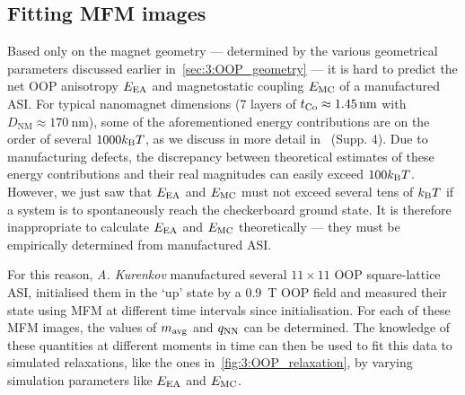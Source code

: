 \subsection{Fitting MFM images}\label{sec:3:MFM}
Based only on the magnet geometry --- determined by the various geometrical parameters discussed earlier in~\cref{sec:3:OOP_geometry} --- it is hard to predict the net OOP anisotropy $E_\mathrm{EA}$ and magnetostatic coupling $E_\mathrm{MC}$ of a manufactured ASI.
For typical nanomagnet dimensions (7 layers of $t_{\ce{Co}} \approx \SI{1.45}{\nano\metre}$ with $D_\mathrm{NM} \approx \SI{170}{\nano\metre}$), some of the aforementioned energy contributions are on the order of several $1000 \kBT$, as we discuss in more detail in~ (Supp. 4). %
Due to manufacturing defects, the discrepancy between theoretical estimates of these energy contributions and their real magnitudes can easily exceed $100 \kBT$. %
However, we just saw that $E_\mathrm{EA}$ and $E_\mathrm{MC}$ must not exceed several tens of $\kBT$ if a system is to spontaneously reach the checkerboard ground state.
It is therefore inappropriate to calculate $E_\mathrm{EA}$ and $E_\mathrm{MC}$ theoretically --- they must be empirically determined from manufactured ASI. \\\par
For this reason, \textit{A. Kurenkov} manufactured several $11 \times 11$ OOP square-lattice ASI, initialised them in the `up' state by a \SI{0.9}{\tesla} OOP field and measured their state using MFM at different time intervals since initialisation.
For each of these MFM images, the values of $m_\mathrm{avg}$ and $q_\mathrm{NN}$ can be determined.
The knowledge of these quantities at different moments in time can then be used to fit this data to simulated relaxations, like the ones in~\cref{fig:3:OOP_relaxation}, by varying simulation parameters like $E_\mathrm{EA}$ and $E_\mathrm{MC}$.

